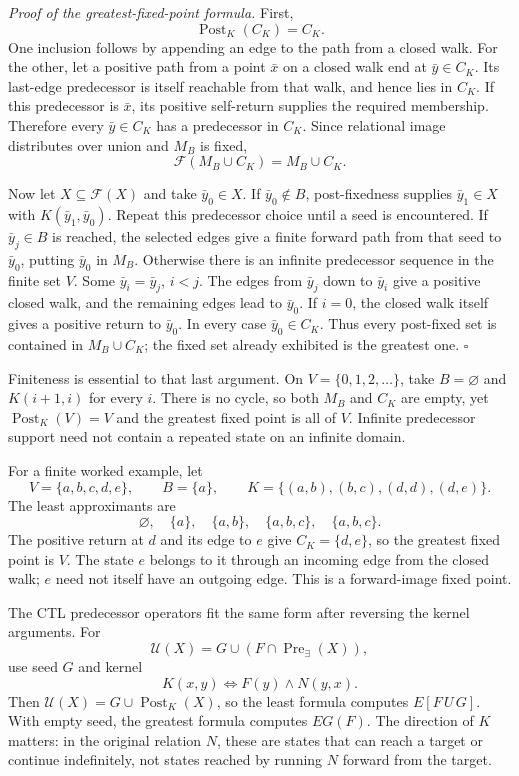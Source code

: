 \emph{Proof of the greatest-fixed-point formula.}
First,
\[
 \operatorname{Post}_K(C_K)=C_K.
\]
One inclusion follows by appending an edge to the path from
a closed walk. For the other, let a positive path from a point
\(\bar x\) on a closed walk end at \(\bar y\in C_K\).
Its last-edge predecessor is itself reachable from that walk,
and hence lies in \(C_K\). If this predecessor is \(\bar x\),
its positive self-return supplies the required membership.
Therefore every \(\bar y\in C_K\) has a predecessor in \(C_K\).
Since relational image distributes over union and \(M_B\)
is fixed,
\[
 \mathcal F(M_B\cup C_K)=M_B\cup C_K.
\]

Now let \(X\subseteq\mathcal F(X)\) and take \(\bar y_0\in X\).
If \(\bar y_0\notin B\), post-fixedness supplies
\(\bar y_1\in X\) with \(K(\bar y_1,\bar y_0)\).
Repeat this predecessor choice until a seed is encountered.
If \(\bar y_j\in B\) is reached, the selected edges give a
finite forward path from that seed to \(\bar y_0\), putting
\(\bar y_0\) in \(M_B\).
Otherwise there is an infinite predecessor sequence in the
finite set \(V\). Some \(\bar y_i=\bar y_j\), \(i<j\).
The edges from \(\bar y_j\) down to \(\bar y_i\) give a
positive closed walk, and the remaining edges lead to
\(\bar y_0\). If \(i=0\), the closed walk itself gives a
positive return to \(\bar y_0\). In every case
\(\bar y_0\in C_K\).
Thus every post-fixed set is contained in \(M_B\cup C_K\);
the fixed set already exhibited is the greatest one.
\(\square\)

Finiteness is essential to that last argument. On
\(V=\{0,1,2,\ldots\}\), take \(B=\varnothing\) and
\(K(i+1,i)\) for every \(i\). There is no cycle, so both
\(M_B\) and \(C_K\) are empty, yet
\(\operatorname{Post}_K(V)=V\) and the greatest fixed point
is all of \(V\). Infinite predecessor support need not
contain a repeated state on an infinite domain.

For a finite worked example, let
\[
 V=\{a,b,c,d,e\},\qquad B=\{a\},\qquad
 K=\{(a,b),(b,c),(d,d),(d,e)\}.
\]
The least approximants are
\[
 \varnothing,\quad\{a\},\quad\{a,b\},\quad\{a,b,c\},
 \quad\{a,b,c\}.
\]
The positive return at \(d\) and its edge to \(e\) give
\(C_K=\{d,e\}\), so the greatest fixed point is \(V\).
The state \(e\) belongs to it through an incoming edge
from the closed walk; \(e\) need not itself have an
outgoing edge. This is a forward-image fixed point.

The CTL predecessor operators fit the same form after
reversing the kernel arguments. For
\[
 \mathcal U(X)=G\cup(F\cap\operatorname{Pre}_{\exists}(X)),
\]
use seed \(G\) and kernel
\[
 K(x,y)\iff F(y)\land N(y,x).
\]
Then \(\mathcal U(X)=G\cup\operatorname{Post}_K(X)\),
so the least formula computes \(E[F\,U\,G]\).
With empty seed, the greatest formula computes
\(EG(F)\). The direction of \(K\) matters: in the
original relation \(N\), these are states that can
reach a target or continue indefinitely, not states
reached by running \(N\) forward from the target.

